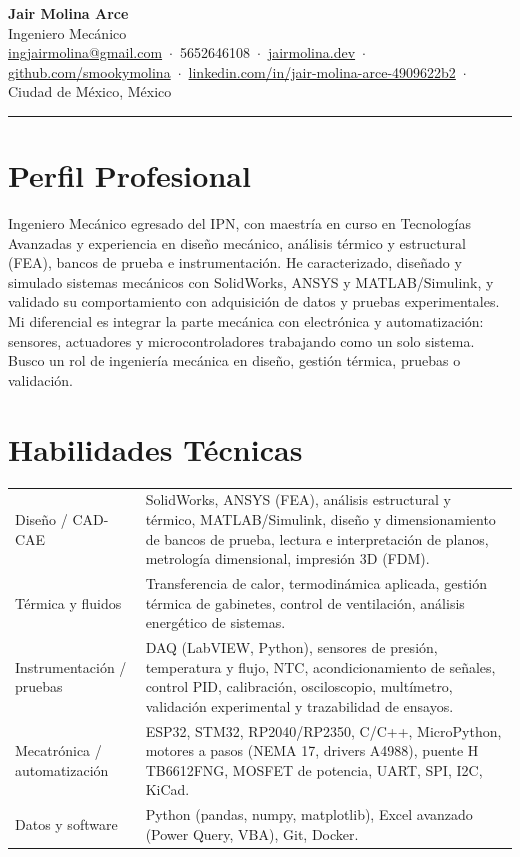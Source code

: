 \documentclass[10pt,a4paper]{article}
\begin{document}
\begin{center}
{\LARGE\bfseries Jair Molina Arce}\\[4pt]
{\large\color{navy} Ingeniero Mec\'anico}\\[4pt]
{\small
\href{mailto:ingjairmolina@gmail.com}{ingjairmolina@gmail.com} \,$\cdot$\,
5652646108 \,$\cdot$\,
\href{https://jairmolina.dev}{jairmolina.dev} \,$\cdot$\,
\href{https://github.com/smookymolina}{github.com/smookymolina} \,$\cdot$\,
\href{https://www.linkedin.com/in/jair-molina-arce-4909622b2/}{linkedin.com/in/jair-molina-arce-4909622b2} \,$\cdot$\,
Ciudad de M\'exico, M\'exico}
\end{center}

\vspace{3pt}
\hrule
\vspace{6pt}

\section{Perfil Profesional}
\small
Ingeniero Mec\'anico egresado del IPN, con maestr\'ia en curso en Tecnolog\'ias Avanzadas y experiencia en dise\~no mec\'anico, an\'alisis t\'ermico y estructural (FEA), bancos de prueba e instrumentaci\'on. He caracterizado, dise\~nado y simulado sistemas mec\'anicos con SolidWorks, ANSYS y MATLAB/Simulink, y validado su comportamiento con adquisici\'on de datos y pruebas experimentales. Mi diferencial es integrar la parte mec\'anica con electr\'onica y automatizaci\'on: sensores, actuadores y microcontroladores trabajando como un solo sistema. Busco un rol de ingenier\'ia mec\'anica en dise\~no, gesti\'on t\'ermica, pruebas o validaci\'on.

\section{Habilidades T\'ecnicas}
\small
\begin{tabularx}{\textwidth}{@{}L@{\hspace{10pt}}X@{}}
Dise\~no / CAD-CAE & SolidWorks, ANSYS (FEA), an\'alisis estructural y t\'ermico, MATLAB/Simulink, dise\~no y dimensionamiento de bancos de prueba, lectura e interpretaci\'on de planos, metrolog\'ia dimensional, impresi\'on 3D (FDM).\\[4pt]
T\'ermica y fluidos & Transferencia de calor, termodin\'amica aplicada, gesti\'on t\'ermica de gabinetes, control de ventilaci\'on, an\'alisis energ\'etico de sistemas.\\[4pt]
Instrumentaci\'on / pruebas & DAQ (LabVIEW, Python), sensores de presi\'on, temperatura y flujo, NTC, acondicionamiento de se\~nales, control PID, calibraci\'on, osciloscopio, mult\'imetro, validaci\'on experimental y trazabilidad de ensayos.\\[4pt]
Mecatr\'onica / automatizaci\'on & ESP32, STM32, RP2040/RP2350, C/C++, MicroPython, motores a pasos (NEMA 17, drivers A4988), puente H TB6612FNG, MOSFET de potencia, UART, SPI, I2C, KiCad.\\[4pt]
Datos y software & Python (pandas, numpy, matplotlib), Excel avanzado (Power Query, VBA), Git, Docker.\\
\end{tabularx}
\end{document}
